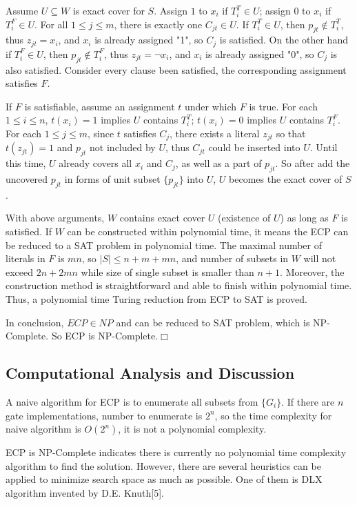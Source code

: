 \documentclass[11pt,twoside, onecolumn]{IEEEtran}
\begin{document}
Assume $U \subseteq W$ is exact cover for $S$. Assign $1$ to $x_i$ if $T_i^T \in U$;
assign $0$ to $x_i$ if $T_i^F \in U$. For all $1\leq j\leq m$, there is exactly one $C_{jt} \in U$.
If $T_i^T \in U$, then $p_{jt}\notin T_i^T$, thus $z_{jt} = x_i$, and $x_i$ is already assigned "1", so
$C_j$ is satisfied. On the other hand if $T_i^F \in U$, then $p_{jt}\notin T_i^F$, thus $z_{jt} = \neg x_i$, 
and $x_i$ is already assigned "0", so $C_j$ is also satisfied. Consider every clause been satisfied,
the corresponding assignment satisfies $F$.

If $F$ is satisfiable, assume an assignment $t$ under which $F$ is true. For each $1\leq i \leq n$,
$t(x_i) = 1$ implies $U$ contains $T_i^T$; $t(x_i) = 0$ implies $U$ contains $T_i^F$. For each
$1\leq j\leq m$, since $t$ satisfies $C_j$, there exists a literal $z_{jt}$ so that $t(z_{jt}) = 1$
and $p_{jt}$ not included by $U$, thus $C_{jt}$ could be inserted into $U$. Until this time,
$U$ already covers all $x_i$ and $C_j$, as well as a part of $p_{jt}$. So after add the uncovered
$p_{jt}$ in forms of unit subset $\{p_{jt}\}$ into $U$, $U$ becomes the exact cover of $S$.

With above arguments, $W$ contains exact cover $U$ (existence of $U$) as long as $F$ is satisfied. If $W$ can be 
constructed within polynomial time, it means the ECP can be reduced to a SAT problem in
polynomial time. The maximal number of literals in $F$ is $mn$, so $|S|\leq n+m+mn$, and
number of subsets in $W$ will not exceed $2n+2mn$ while size of single subset is smaller than $n+1$.
Moreover, the construction method is straightforward and able to finish within polynomial time.
Thus, a polynomial time Turing reduction from ECP to SAT is proved.

In conclusion, $ECP \in NP$ and can be reduced to SAT problem, which is NP-Complete. So ECP is NP-Complete.$\Box$

\subsection{Computational Analysis and Discussion}
A naive algorithm for ECP is to enumerate all subsets from $\{G_i\}$. If there are $n$ gate implementations,
number to enumerate is $2^n$, so the time complexity for naive algorithm is $O(2^n)$, it is not a polynomial
complexity.

ECP is NP-Complete indicates there is currently no polynomial time complexity algorithm to find the
solution. However, there are several heuristics can be applied to minimize search space as much as possible.
One of them is DLX algorithm invented by D.E. Knuth[5].
\end{document}
